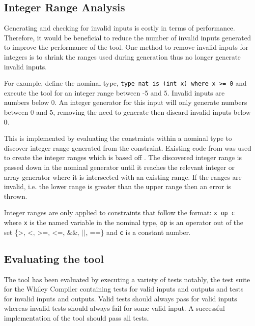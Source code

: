 \subsection{Integer Range Analysis}

Generating and checking for invalid inputs is costly in terms of performance. 
Therefore, it would be beneficial to reduce the number of invalid inputs generated to improve the performance of the tool.
One method to remove invalid inputs for integers is to shrink the ranges used during generation thus no longer generate invalid inputs.

For example, define the nominal type, \texttt{type nat is (int x) where x \textgreater= 0} and execute the tool for an integer range between -5 and 5. Invalid inputs are numbers below 0. An integer generator for this input will only generate numbers between 0 and 5, removing the need to generate then discard invalid inputs below 0.

This is implemented by evaluating the constraints within a nominal type to discover integer range generated from the constraint.
Existing code from \cite{whileyIntegerRangeCode} was used to create the integer ranges which is based off \cite{whileyIntegerRange}.
The discovered integer range is passed down in the nominal generator until it reaches the relevant integer or array generator where it is intersected with an existing range.
If the ranges are invalid, i.e. the lower range is greater than the upper range then an error is thrown.

Integer ranges are only applied to constraints that follow the format: \texttt{x op c} where \texttt{x} is the named variable in the nominal type, \texttt{op} is an operator out of the set \{\textgreater, \textless, \textgreater=, \textless=, \&\&, $||$, ==\} and \texttt{c} is a constant number.

\subsection{Evaluating the tool}
The tool has been evaluated by executing a variety of tests notably, the test suite for the Whiley Compiler containing tests for valid inputs and outputs and tests for invalid inputs and outputs. 
Valid tests should always pass for valid inputs whereas invalid tests should always fail for some valid input. 
A successful implementation of the tool should pass all tests.



